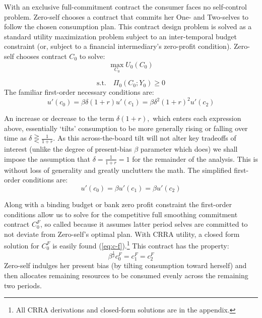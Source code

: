 \documentclass[11pt,english]{article}
\theoremstyle{plain}
\theoremstyle{definition}
\begin{document}
With an exclusive full-commitment contract the consumer faces no self-control
problem. Zero-self chooses a contract that commits her One- and Two-selves
to follow the chosen consumption plan. This contract design problem
is solved as a standard utility maximization problem subject to an
inter-temporal budget constraint (or, subject to a financial intermediary's
zero-profit condition). Zero-self chooses contract $C_{0}$ to solve:
\begin{equation}
\max_{C_{0}}U_{0}(C_{0})\label{eq:cobj0}
\end{equation}

\begin{equation}
\text{s.t.}\quad\Pi_{0}(C_{0};Y_{0})\geq0\label{eq:BPC0}
\end{equation}
The familiar first-order necessary conditions are: 
\begin{equation}
u'\left(c_{0}\right)=\beta\delta(1+r)u'\left(c_{1}\right)=\beta\delta^{2}(1+r)^{2}u'\left(c_{2}\right)
\end{equation}

An increase or decrease to the term $\delta(1+r),$ which enters each
expression above, essentially `tilts' consumption to be more generally
rising or falling over time as $\delta\gtreqless\frac{1}{1+r}$. As
this across-the-board tilt will not alter key tradeoffs of
interest (unlike the degree of present-bias $\beta$ parameter which
does) we shall impose the assumption that $\delta=\frac{1}{1+r}=1$
for the remainder of the analysis. This is without loss of generality
and greatly unclutters the math. The simplified first-order conditions
are: 
\begin{equation}
u'\left(c_{0}\right)=\beta u'\left(c_{1}\right)=\beta u'\left(c_{2}\right)\label{eq:FOC_comp}
\end{equation}

Along with a binding budget or bank zero profit constraint the first-order conditions
allow us to solve for the competitive full smoothing  commitment
contract $C_{0}^{F}$, so called because it assumes latter period selves are committed to not deviate from Zero-self's optimal plan. With CRRA utility, a closed form solution
for $C_{0}^{F}$ is easily found (\ref{eq:c-f}).\footnote{All CRRA derivations and closed-form solutions are in the appendix.}
This contract has the property: 
\begin{equation}
\beta^{\frac{1}{\rho}}c_{0}^{F}=c_{1}^{F}=c_{2}^{F}
\end{equation}
Zero-self  indulges her present bias (by tilting consumption
toward herself) and then allocates remaining resources to be consumed evenly across
the remaining two periods. 
\end{document}
